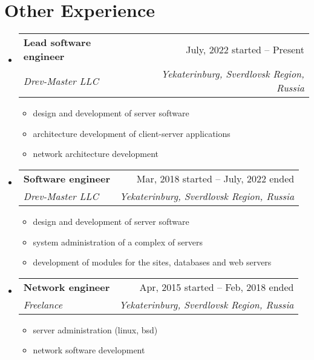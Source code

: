\documentclass[letterpaper,11pt]{article}
\makeatletter
\newcommand{\resumeItem}[1]{
    \item{
                {#1 \vspace{-4pt}}
          }
}
\newcommand{\resumeSubheading}[4]{
    \vspace{-2pt}\item
    \begin{tabular*}{0.97\textwidth}[t]{l@{\extracolsep{\fill}}r}
        \textbf{#1} & #2 \\
        \textit{\small #3} & \textit{\small #4} \\
    \end{tabular*}\vspace{-10pt}
}
\newcommand{\resumeSubHeadingListStart}{\begin{itemize}[leftmargin=0.15in, label={}]}
\newcommand{\resumeSubHeadingListEnd}{\end{itemize}}
\newcommand{\resumeItemListStart}{\begin{itemize}}
\newcommand{\resumeItemListEnd}{\end{itemize}\vspace{-2pt}}
\makeatother
\begin{document}

\section{Other Experience}
\resumeSubHeadingListStart

\resumeSubheading
    {Lead software engineer}{July, 2022 started -- Present}
    {Drev-Master LLC}{Yekaterinburg, Sverdlovsk Region, Russia}
    \resumeItemListStart
        \small\resumeItem{design and development of server software}
        \resumeItem{architecture development of client-server applications}
        \resumeItem{network architecture development}
    \resumeItemListEnd

\resumeSubheading
    {Software engineer}{Mar, 2018 started -- July, 2022 ended}
    {Drev-Master LLC}{Yekaterinburg, Sverdlovsk Region, Russia}
    \resumeItemListStart
        \small\resumeItem{design and development of server software}
        \resumeItem{system administration of a complex of servers}
        \resumeItem{development of modules for the sites, databases and web servers}
    \resumeItemListEnd

\resumeSubheading
    {Network engineer}{Apr, 2015 started -- Feb, 2018 ended}
    {Freelance}{Yekaterinburg, Sverdlovsk Region, Russia}
    \resumeItemListStart
        \small\resumeItem{server administration (linux, bsd)}
        \resumeItem{network software development}
    \resumeItemListEnd

\resumeSubHeadingListEnd


\end{document}
